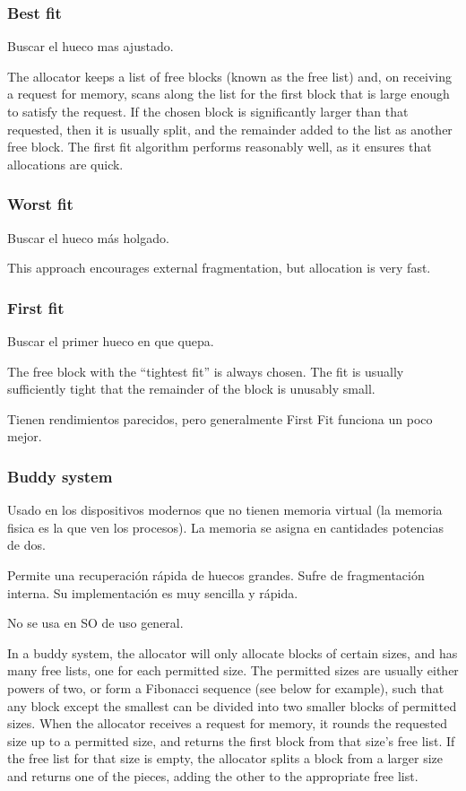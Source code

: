 \documentclass[a4paper, twoside]{article}
\begin{document}
\subsubsection{Best fit}
Buscar el hueco mas ajustado.

The allocator keeps a list of free blocks (known as the free list) and, on receiving a request for memory, scans along the list for the first block that is large enough to satisfy the request. If the chosen block is significantly larger than that requested, then it is usually split, and the remainder added to the list as another free block. The first fit algorithm performs reasonably well, as it ensures that allocations are quick.

\subsubsection{Worst fit}
Buscar el hueco más holgado.

This approach encourages external fragmentation, but allocation is very fast.

\subsubsection{First fit}
Buscar el primer hueco en que quepa.

The free block with the “tightest fit” is always chosen. The fit is usually sufficiently tight that the remainder of the block is unusably small.

Tienen rendimientos parecidos, pero generalmente First Fit funciona un poco mejor.

\subsubsection{Buddy system} 
Usado en los dispositivos modernos que no tienen memoria virtual (la memoria fisica es la que ven los procesos). 
La memoria se asigna en cantidades potencias de dos.

Permite una recuperación rápida de huecos grandes. Sufre de fragmentación interna. Su implementación es muy sencilla y rápida.

No se usa en SO de uso general.

In a buddy system, the allocator will only allocate blocks of certain sizes, and has many free lists, one for each permitted size. The permitted sizes are usually either powers of two, or form a Fibonacci sequence (see below for example), such that any block except the smallest can be divided into two smaller blocks of permitted sizes.
When the allocator receives a request for memory, it rounds the requested size up to a permitted size, and returns the first block from that size’s free list. If the free list for that size is empty, the allocator splits a block from a larger size and returns one of the pieces, adding the other to the appropriate free list.
\end{document}
